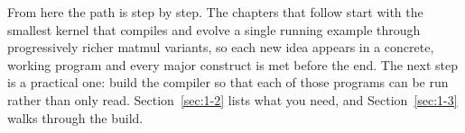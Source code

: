 From here the path is step by step. The chapters that follow start with the smallest kernel that compiles and evolve a single running example through progressively richer matmul variants, so each new idea appears in a concrete, working program and every major construct is met before the end. The next step is a practical one: build the compiler so that each of those programs can be run rather than only read. Section~\ref{sec:1-2} lists what you need, and Section~\ref{sec:1-3} walks through the build.
